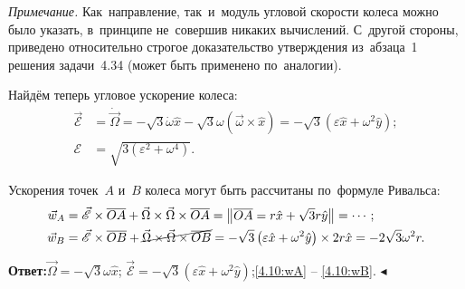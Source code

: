 \documentclass{weekly}
\begin{document}
\textsl{Примечание.} Как~направление, так~и~модуль угловой скорости
колеса можно было указать, в~принципе не~совершив никаких вычислений.
С~другой стороны, приведено относительно строгое доказательство
утверждения из~абзаца~1 решения задачи~4.34 (может быть применено
по~аналогии).

Найдём теперь угловое ускорение колеса:
\begin{align}
    \vec{\mathscr{E}} &= \dot{\vec\Omega}
        = -\sqrt{3} \dot\omega \hat x -
            \sqrt{3} \omega \left(\vec\omega \times \hat x\right)
        = -\sqrt{3} \left( \varepsilon \hat x + \omega^2 \hat y \right);
\\
    \mathscr{E} &= \sqrt{3 \left(\varepsilon^2 + \omega^4\right)}.
\end{align}

Ускорения точек~$A$ и~$B$ колеса могут быть рассчитаны
по~формуле Ривальса:
\begin{align}
    \vec w_A &= \vec{\mathscr{E}} \times \overline{OA} +
            \vec\Omega \times \vec\Omega \times \overline{OA}
        = \begin{Vmatrix} \overline{OA} = r\hat x + \sqrt{3}r \hat y \end{Vmatrix}
        = \cdots; \label{4.10:wA} \\
    \vec w_B &= \vec{\mathscr{E}} \times \overline{OB} +
            \cancel{\vec\Omega \times \vec\Omega \times \overline{OB}}
        = -\sqrt{3} \left( \varepsilon \hat x + \omega^2 \hat y \right)
            \times 2r \hat x
        = -2\sqrt{3} \omega^2 r. \label{4.10:wB}
\end{align}

\textbf{Ответ:}\quad $\vec{\Omega} = -\sqrt{3}\omega \hat x$;\qquad
$\vec{\mathscr{E}} = -\sqrt{3} \left( \varepsilon \hat x +
\omega^2 \hat y \right)$;\qquad \eqref{4.10:wA} -- \eqref{4.10:wB}.
\hfill $\blacktriangleleft$
\end{document}
